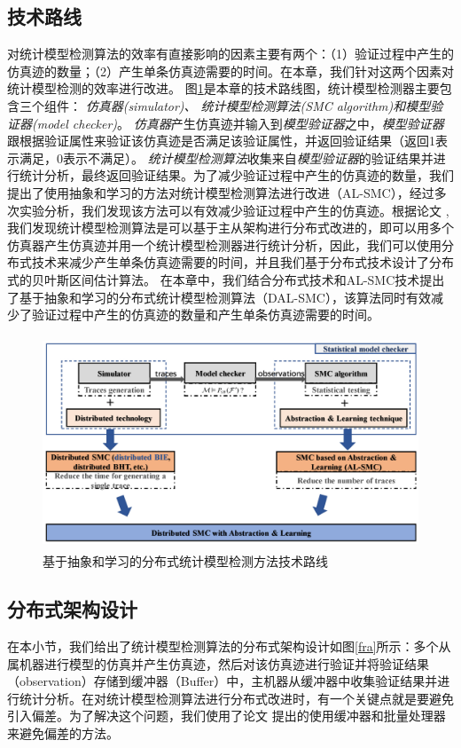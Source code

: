 \subsection{技术路线}
\label{sec:roadmap}
对统计模型检测算法的效率有直接影响的因素主要有两个：（1）验证过程中产生的仿真迹的数量；（2）产生单条仿真迹需要的时间。在本章，我们针对这两个因素对统计模型检测的效率进行改进。 图\ref{tech-map}是本章的技术路线图，统计模型检测器主要包含三个组件： \emph{仿真器(simulator)、 统计模型检测算法(SMC algorithm)和模型验证器(model checker)}。 \emph{仿真器}产生仿真迹并输入到\emph{模型验证器}之中，\emph{模型验证器}跟根据验证属性来验证该仿真迹是否满足该验证属性，并返回验证结果（返回1表示满足，0表示不满足）。 \emph{统计模型检测算法}收集来自\emph{模型验证器}的验证结果并进行统计分析，最终返回验证结果。为了减少验证过程中产生的仿真迹的数量，我们提出了使用抽象和学习的方法对统计模型检测算法进行改进（AL-SMC），经过多次实验分析，我们发现该方法可以有效减少验证过程中产生的仿真迹。根据论文  \cite{younes2005ymer}, 我们发现统计模型检测算法是可以基于主从架构进行分布式改进的，即可以用多个仿真器产生仿真迹并用一个统计模型检测器进行统计分析，因此，我们可以使用分布式技术来减少产生单条仿真迹需要的时间，并且我们基于分布式技术设计了分布式的贝叶斯区间估计算法。  在本章中，我们结合分布式技术和AL-SMC技术提出了基于抽象和学习的分布式统计模型检测算法（DAL-SMC），该算法同时有效减少了验证过程中产生的仿真迹的数量和产生单条仿真迹需要的时间。
\begin{figure}[htbp]
	{
	\centering	
	\includegraphics[width=5.0in,height=2.5in]{fig/4/paper-framework.png}
\caption{基于抽象和学习的分布式统计模型检测方法技术路线}\label{tech-map}	
	}	
\end{figure}
\subsection{分布式架构设计}
在本小节，我们给出了统计模型检测算法的分布式架构设计如图\ref{fra}所示：多个从属机器进行模型的仿真并产生仿真迹，然后对该仿真迹进行验证并将验证结果（observation）存储到缓冲器（Buffer）中，主机器从缓冲器中收集验证结果并进行统计分析。在对统计模型检测算法进行分布式改进时，有一个关键点就是要避免引入偏差。为了解决这个问题，我们使用了论文 \cite{Bulychev2012Checking}提出的使用缓冲器和批量处理器来避免偏差的方法。

